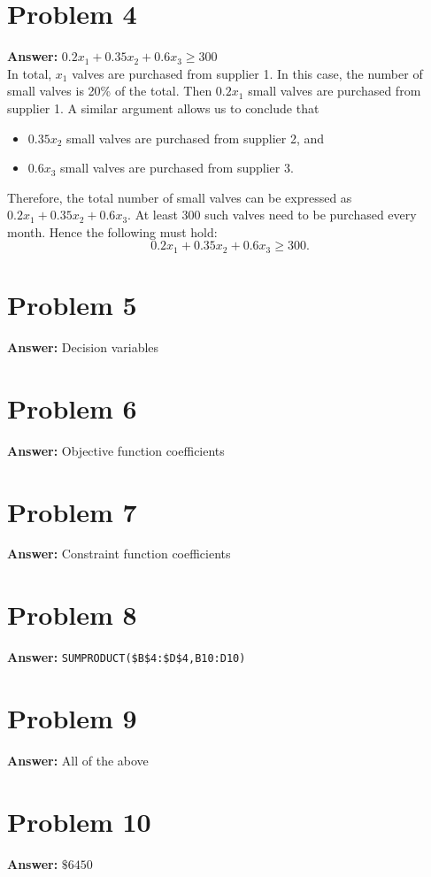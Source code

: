 \documentclass[11pt]{article}
\begin{document}
\section*{Problem 4}
\label{sec:org897f3c7}

\textbf{Answer:} \(0.2x_1+0.35x_2+0.6x_3\geq 300\)\\

In total, \(x_1\) valves are purchased from supplier 1. In this case, the
number of small valves is 20\% of the total. Then \(0.2x_1\) small valves are
purchased from supplier 1. A similar argument allows us to conclude that
\begin{itemize}
\item \(0.35x_2\) small valves are purchased from supplier 2, and
\item \(0.6x_3\) small valves are purchased from supplier 3.
\end{itemize}
Therefore, the total number of small valves can be expressed as
\(0.2x_1+0.35x_2+0.6x_3\). At least 300 such valves need to be purchased every
month. Hence the following must hold:
\begin{equation}
0.2x_1+0.35x_2+0.6x_3\geq 300.
\end{equation}
\section*{Problem 5}
\label{sec:orgb9bd321}

\textbf{Answer:} Decision variables
\section*{Problem 6}
\label{sec:orgee350ec}

\textbf{Answer:} Objective function coefficients
\section*{Problem 7}
\label{sec:org0bacb2d}

\textbf{Answer:} Constraint function coefficients
\section*{Problem 8}
\label{sec:orgd33200f}

\textbf{Answer:} \texttt{SUMPRODUCT(\$B\$4:\$D\$4,B10:D10)}
\section*{Problem 9}
\label{sec:org752ce50}

\textbf{Answer:} All of the above
\section*{Problem 10}
\label{sec:orgb01e82e}

\textbf{Answer:} \(\$ 6450\)
\end{document}
